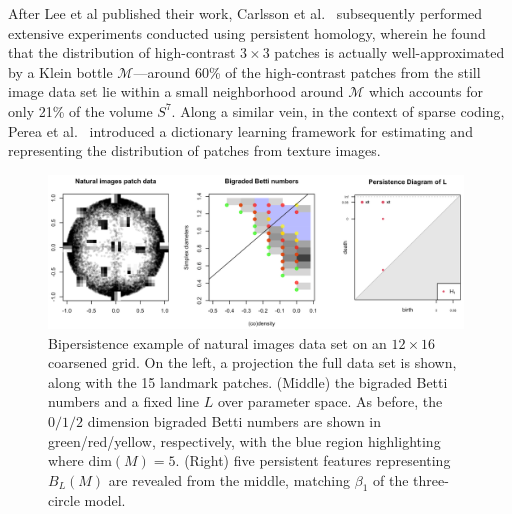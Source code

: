 \documentclass[sn-mathphys]{sn-jnl}
\begin{document}
After Lee et al published their work, Carlsson et al.~\cite{carlsson2008local} subsequently performed extensive experiments conducted using persistent homology, wherein he found that the distribution of high-contrast $3 \times 3$ patches is actually well-approximated by a Klein bottle $\mathcal{M}$---around 60\% of the high-contrast patches from the still image data set lie within a small neighborhood around $\mathcal{M}$ which accounts for only 21\% of the volume $S^7$. Along a similar vein, in the context of sparse coding, Perea et al.~\cite{perea2014klein} introduced a dictionary learning framework for estimating and representing the distribution of patches from texture images. 

 \begin{figure}[t]
	\includegraphics[width=0.98\textwidth]{natural_images}
	\caption{Bipersistence example of natural images data set on an $12 \times 16$ coarsened grid. On the left, a projection the full data set is shown, along with the 15 landmark patches. (Middle) the bigraded Betti numbers and a fixed line $L$ over parameter space. 
	As before, the $0/1/2$ dimension bigraded Betti numbers are shown in green/red/yellow, respectively, with the blue region highlighting where $\mathrm{dim}(M) = 5$. (Right) five persistent features representing $B_L(M)$ are revealed from the middle, matching $\beta_1$ of the three-circle model. }
	\label{fig:patch_data_dgm}
\end{figure}
\end{document}
